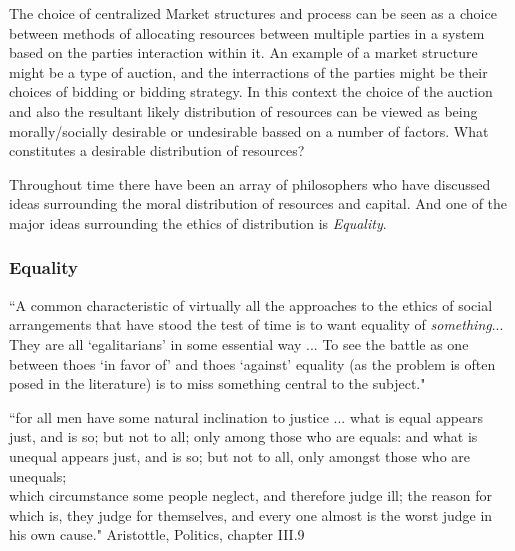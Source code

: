 The choice of centralized Market structures and process can be seen as a choice between methods of allocating resources between multiple parties in a system based on the parties interaction within it.
An example of a market structure might be a type of auction, and the interractions of the parties might be their choices of bidding or bidding strategy.
In this context the choice of the auction and also the resultant likely distribution of resources can be viewed as being morally/socially desirable or undesirable bassed on a number of factors.
What constitutes a desirable distribution of resources?


Throughout time there have been an array of philosophers who have discussed ideas surrounding the moral distribution of resources and capital. And one of the major ideas surrounding the ethics of distribution is \textit{Equality}.

\subsubsection{Equality}

\begin{displayquote}
``A common characteristic of virtually all the approaches to the ethics of social arrangements that have stood the test of time is to want equality of \textit{something}... They are all `egalitarians' in some essential way ... To see the battle as one between thoes `in favor of' and thoes `against' equality (as the problem is often posed in the literature) is to miss something central to the subject."\cite{18084} 
\end{displayquote}

\begin{displayquote}
``for all men have some natural inclination to justice ... what is equal appears just, and is so; but not to all; only among those who are equals: and what is unequal appears just, and is so; but not to all, only amongst those who are unequals;\\
which circumstance some people neglect, and therefore judge ill; the reason for which is, they judge for themselves, and every one almost is the worst judge in his own cause." Aristottle, Politics, chapter III.9\cite{AristotleGutenberg}
\end{displayquote}


